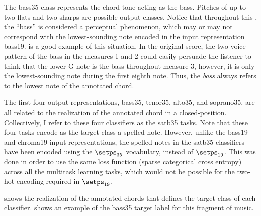 
The \gls{bass35} class represents the chord tone acting as
the bass. Pitches of up to two flats and two sharps are
possible output classes. Notice that throughout this
\thesisdiss{}, the ``bass'' is considered a perceptual
phenomenon, which may or may not correspond with the
lowest-sounding note encoded in the input representation
\gls{bass19}.  is a good example of
this situation. In the original score, the two-voice pattern
of the bass in the measures 1 and 2 could easily persuade
the listener to think that the lower G note is the bass
throughout measure 3, however, it is only the
lowest-sounding note during the first eighth note. Thus, the
\emph{bass} always refers to the lowest note of the
annotated chord.

The first four output representations, \gls{bass35},
\gls{tenor35}, \gls{alto35}, and \gls{soprano35}, are all
related to the realization of the annotated chord in a
\gls{closed-position}. Collectively, I refer to these four
classifiers as the \gls{satb35} tasks. Note that these four
tasks encode as the target class a spelled note. However,
unlike the \gls{bass19} and \gls{chroma19} input
representations, the spelled notes in the \gls{satb35}
classifiers have been encoded using the $\setps_{35}$
vocabulary, instead of $\setps_{19}$. This was done in order
to use the same loss function (sparse categorical cross
entropy) across all the multitask learning tasks, which
would not be possible for the two-hot encoding required in
$\setps_{19}$.

 shows the realization of the annotated
chords that defines the target class of each classifier.
 shows an example of the \gls{bass35}
target label for this fragment of music.




